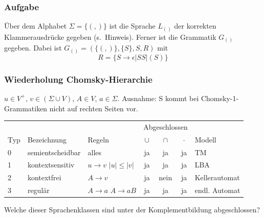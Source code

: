 
\begin{frame}
	\frametitle{Aufgabe}
	
	Über dem Alphabet $\Sigma=\{(,)\}$ ist die Sprache $L_{()}$  der korrekten
Klammerausdrücke gegeben (s.~Hinweis). Ferner ist die Grammatik $G_{()}$ gegeben.
Dabei ist $G_{()} = (\{(,)\}, \{S\}, S, R)$ mit 
$$R=\{S \rightarrow \epsilon|SS|(S)\}$$

\end{frame}

\begin{frame}
 \frametitle{Wiederholung Chomsky-Hierarchie}
 $u \in V^+$, $v \in (\Sigma \cup V)$, $A \in V$, $a \in \Sigma$.
  Ausnahme: S kommt bei Chomsky-1-Grammatiken nicht auf rechten Seiten vor.
 \begin{table}
 \begin{center}
 \begin{tabular}{| l | l | p{1.4cm} | c | c | c | l |}
 \hline
 & & & \multicolumn{3}{|c|}{Abgeschlossen} &\\
 Typ & Bezeichnung & Regeln & $\cup$ & $\cap$ & $\cdot$ & Modell\\ \hline
 0 & semientscheidbar & alles & ja & ja & ja & TM \\ \hline
 1 & kontextsensitiv & $u \rightarrow v$ $|u| \leq |v|$ & ja & ja & ja &  LBA \\ \hline
 2 & kontextfrei & $A \rightarrow v$ & ja & nein & ja & Kellerautomat \\ \hline
 3 & regulär & $A \rightarrow a$  $A \rightarrow aB$ & ja & ja & ja & endl. Automat \\ \hline
 \end{tabular}
 \end{center}
 \end{table}

Welche dieser Sprachenklassen sind unter der Komplementbildung abgeschlossen?
\end{frame}

